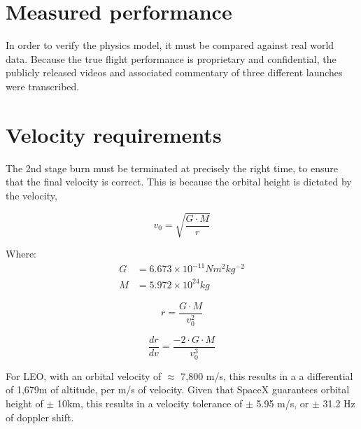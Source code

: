 \section{Measured performance}

In order to verify the physics model, it must be compared against real world data. Because the true flight performance is proprietary and confidential, the publicly released videos and associated commentary of three different launches were transcribed. 






\begin{comment}
\begin{figure}[!htb]
\centering
\texttt{[image: Falcon9/Falcon9R.pdf]}
\caption{Falcon 9 Rocket}
\label{fig:Rocket}
\end{figure}
\end{comment}



\section{Velocity requirements}
The 2nd stage burn must be terminated at precisely the right time, to ensure that the final velocity is correct. This is because the orbital height is dictated by the velocity, 

\begin{equation}
v_0 = \sqrt{\frac{G \cdot M}{r}}
\end{equation}

Where:
\begin{align*}
G &= 6.673 \times 10^{-11} N m^2 kg^{-2}\\
M &= 5.972 \times 10^{24} kg
\end{align*}

\begin{equation}
r = \frac{G \cdot M}{v_0^2}
\end{equation}

\begin{equation}
\frac{dr}{dv} = \frac{-2 \cdot G \cdot M}{v_0^3}
\end{equation}

For \ac{LEO}, with an orbital velocity of $\approx$ 7,800 m/s, this results in a a differential of 1,679m of altitude, per m/s of velocity. Given that SpaceX guarantees orbital height of $\pm$ 10km, this results in a velocity tolerance of $\pm$ 5.95 m/s, or $\pm$ 31.2 Hz of doppler shift.

